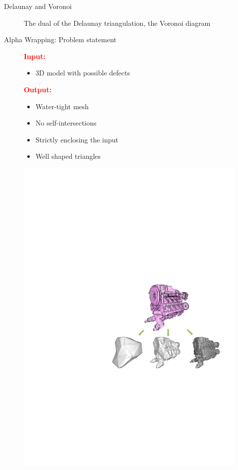 \documentclass[12pt]{beamer}
\begin{document}
\begin{frame}{Delaunay and Voronoi}
\begin{figure}[H]
\begin{minipage}{0.49\textwidth}
        \caption{The dual of the Delaunay triangulation, the Voronoi diagram}
    \end{minipage}
  \end{figure}
\end{frame}



\begin{frame}{Alpha Wrapping: Problem statement}
  \begin{figure}[H]
    \centering
    \begin{minipage}{0.45\textwidth}
      \textcolor{red}{\textbf{Input:}}
       \begin{itemize}
        \item  3D model with possible defects
        \end{itemize}
       \textcolor{red}{\textbf{Output:} }
        \begin{itemize}
          \item Water-tight mesh
          \item No self-intersections
          \item Strictly enclosing the input
          \item Well shaped triangles
       \end{itemize}
    \end{minipage}\hfill
    \begin{minipage}{0.45\textwidth}
        \centering
        \includegraphics[width=1.2\textwidth]{images/alpha-wrapping_motor.jpg}

\end{minipage}
\end{figure}
\end{frame}
\end{document}
